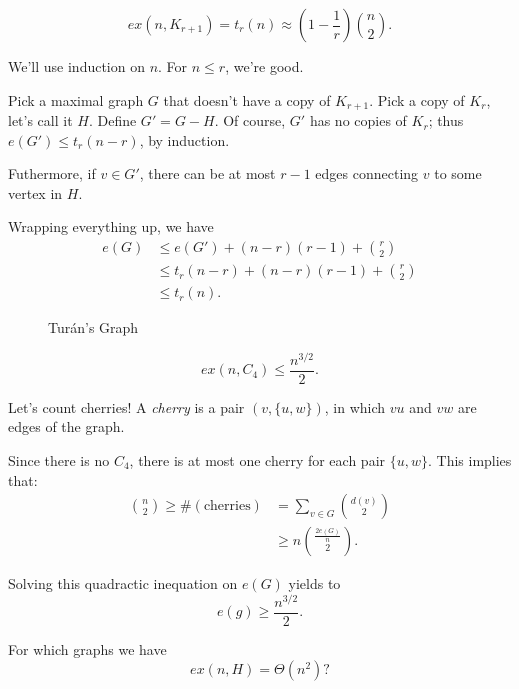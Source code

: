 \begin{thm}[Turán, 1941]
	\[
		ex(n, K_{r+1}) = t_r(n) \approx \left(1 - \frac{1}{r}\right)\binom{n}{2}.
	\]
\end{thm}

\begin{dem}
	We'll use induction on $n$. For $n \le r$, we're good.

	Pick a maximal graph $G$ that doesn't have a copy of $K_{r+1}$. Pick a copy of $K_r$, let's call it $H$. Define $G' = G - H$. Of course, $G'$ has no copies of $K_r$; thus $e(G') \le t_r(n-r)$, by induction.

	Futhermore, if $v \in G'$, there can be at most $r - 1$ edges connecting $v$ to some vertex in $H$.

	Wrapping everything up, we have
	\begin{align*}
		e(G) &\le e(G') + (n-r)(r-1) + \binom{r}{2}\\
			 &\le t_r(n-r) + (n-r)(r-1) + \binom{r}{2}\\
			 &\le t_r(n).
	\end{align*}
\end{dem}

\begin{figure}[h]
    \centering
    \caption{Turán's Graph}
    \label{fig:grafo-de-turan}
\end{figure}

\begin{thm}[Erd\H{o}s, 1935]
	\[
		ex(n, C_4) \le \frac{n^{3/2}}{2}.
	\]
\end{thm}

\begin{dem}
	Let's count cherries! A \emph{cherry} is a pair $(v, \{u, w\})$, in which $vu$ and $vw$ are edges of the graph. 

	Since there is no $C_4$, there is at most one cherry for each pair $\{u, w\}$. This implies that:
	 \begin{align*}
		 \binom{n}{2} \ge \#(\text{cherries}) &= \sum_{v \in G} \binom{d(v)}{2}\\
			&\ge n\binom{\frac{2e(G)}{n}}{2}.
	\end{align*}

	Solving this quadractic inequation on $e(G)$ yields to  \[
		e(g) \ge \frac{n^{3/2}}{2}.
	\]
\end{dem}

\begin{ques}
	For which graphs we have \[
		ex(n, H) = \Theta(n^2)?
	\]
\end{ques}


